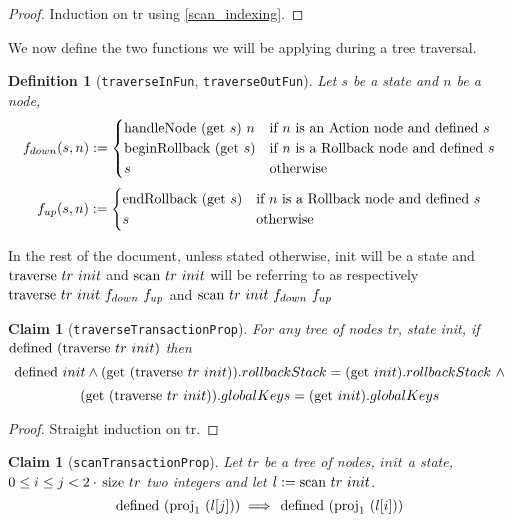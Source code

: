\documentclass{article}
\newtheorem{definition}[lemma]{Definition}
\newtheorem{claim}[lemma]{Claim}
\newcommand{\textfun}[1]{\textup{#1}}
\newcommand{\textcode}[1]{\texttt{#1}}
\newcommand{\fdown}[2]{\ensuremath{f_{down}(#1, #2)}}
\newcommand{\fup}[2]{\ensuremath{f_{up}(#1, #2)}}
\newcommand{\longtraverse}[4]{\textfun{traverse}\ #1\ #2\ #3 \ #4}
\newcommand{\traverse}[2]{\textfun{traverse}\ #1\ #2}
\newcommand{\longscan}[4]{\textfun{scan}\ #1\ #2\ #3 \ #4}
\newcommand{\scan}[2]{\textfun{scan}\ #1\ #2}
\newcommand{\hNode}[2]{\textfun{handleNode}\ #1\ #2}
\newcommand{\beginRb}[1]{\textfun{beginRollback}\ #1}
\newcommand{\enRb}[1]{\textfun{endRollback}\ #1}
\newcommand{\defined}[1]{\textfun{defined}\ #1}
\newcommand{\get}[1]{\textfun{get}\ #1}
\newcommand{\size}[1]{\textfun{size}\ #1}
\newcommand{\fst}[1]{\textfun{proj}_1\ #1}
\begin{document}
\begin{proof}
    Induction on tr using \cref{scan_indexing}.
\end{proof}

We now define the two functions we will be applying during a tree traversal.

\begin{definition}[\textcode{traverseInFun}, \textcode{traverseOutFun}]
    Let $s$ be a state and $n$ be a node, 
    \[\fdown{s}{n} : = 
    \begin{cases} 
        \hNode{(\get{s})}{n}& \text{if $n$ is an Action node and $\defined{s}$} \\
        \beginRb{(\get{s})} & \text{if $n$ is a Rollback node and $\defined{s}$} \\
        s& \text{otherwise}
    \end{cases} \]
    \[\fup{s}{n} : = 
    \begin{cases} 
        \enRb{(\get{s})} & \text{if $n$ is a Rollback node and $\defined{s}$} \\
        s& \text{otherwise}
    \end{cases} \]
\end{definition}

In the rest of the document, unless stated otherwise, init will be a state and $\traverse{tr}{init}$ and $\scan{tr}{init}$ will be referring to as respectively
$\longtraverse{tr}{init}{f_{down}}{f_{up}}$ and $\longscan{tr}{init}{f_{down}}{f_{up}}$

\begin{claim}[\textcode{traverseTransactionProp}]
    For any tree of nodes tr, state init, if $\defined{(\traverse{tr}{init})}$ then
    \label{traverse_prop}
        \[\defined{init} \land (\get{(\traverse{tr}{init})}).rollbackStack = (\get{init}).rollbackStack \  \land\]
        \[(\get{(\traverse{tr}{init})}).globalKeys = (\get{init}).globalKeys\]
\end{claim}

\begin{proof}
    Straight induction on tr. 
\end{proof}

\begin{claim}[\textcode{scanTransactionProp}]
    \label{defined_prop}
    Let $tr$ be a tree of nodes, $init$ a state, $0 \leq i \leq j < 2 \cdot\, \size{tr} $ two integers and let $l:= \scan{tr}{init}$.
    \[\defined (\fst{(l[j])}) \implies\, \defined (\fst{(l[i])})\]
\end{claim}
\end{document}
